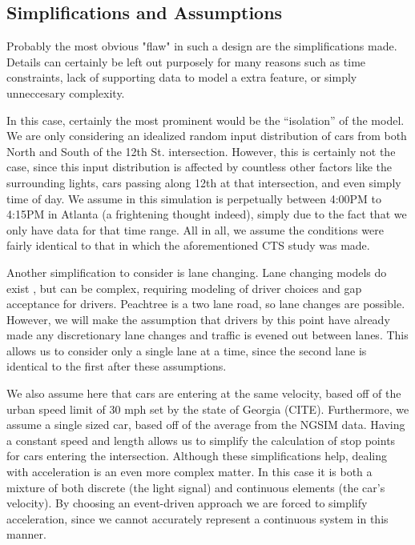\documentclass[a4paper,12pt]{article}
\begin{document}
\subsection{Simplifications and Assumptions}
Probably the most obvious "flaw" in such a design are the simplifications made. Details can certainly be left out
purposely for many reasons such as time constraints, lack of supporting data to model a extra feature, or simply
unneccesary complexity.

In this case, certainly the most prominent would be the ``isolation'' of the model. We are only considering an
idealized random input distribution of cars from both North and South of the 12th St. intersection. However, this is
certainly not the case, since this input distribution is affected by countless other factors like the surrounding
lights, cars passing along 12th at that intersection, and even simply time of day. We assume in this simulation is
perpetually between 4:00PM to 4:15PM in Atlanta (a frightening thought indeed), simply due to the fact that we only
have data for that time range. All in all, we assume the conditions were fairly identical to that in which the 
aforementioned CTS study was made.

Another simplification to consider is lane changing. Lane changing models do exist \cite{lanechanging} \cite{lanechanging2},
but can be complex, requiring modeling of driver choices and gap acceptance for drivers. Peachtree is a two lane road,
so lane changes are possible. However, we will make the assumption that drivers by this point have already made any
discretionary lane changes and traffic is evened out between lanes. This allows us to consider only a single lane at a
time, since the second lane is identical to the first after these assumptions.

We also assume here that cars are entering at the same velocity, based off of the urban speed limit of 30 mph set by
the state of Georgia (CITE). Furthermore, we assume a single sized car, based off of the average from the NGSIM data.
Having a constant speed and length allows us to simplify the calculation of stop points for cars entering the
intersection. Although these simplifications help, dealing with acceleration is an even more complex matter. In this
case it is both a mixture of both discrete (the light signal) and continuous elements (the car's velocity). By choosing
an event-driven approach we are forced to simplify acceleration, since we cannot accurately represent a continuous
system in this manner.
\end{document}
